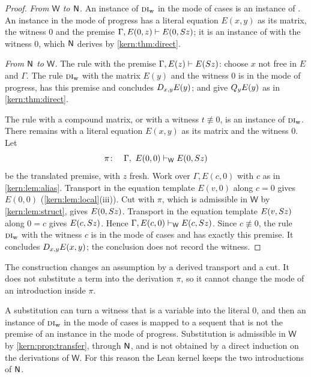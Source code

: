 \begin{proof}
\emph{From $\mathsf{W}$ to $\mathsf{N}$.}  An instance of
$\rulename{DI}_{\mathrm{w}}$ in the mode of cases is an instance of
.  An instance in the mode of progress has a literal equation
$E(x,y)$ as its matrix, the witness $0$ and the premise
$\Gamma,E(0,z)\vdash E(0,S z)$; it is an instance of  with
the witness $0$, which $\mathsf{N}$ derives by \cref{kern:thm:direct}.

\emph{From $\mathsf{N}$ to $\mathsf{W}$.}  The rule  with the premise
$\Gamma,E(z)\vdash E(S z)$: choose $x$ not free in $E$ and $\Gamma$.  The
rule $\rulename{DI}_{\mathrm{w}}$ with the matrix $E(y)$ and the witness $0$
is in the mode of progress, has this premise and concludes
$D_{x,y}E(y)$;  and  give $Q_{y}E(y)$ as in
\cref{kern:thm:direct}.

The rule  with a compound matrix, or with a witness
$t\not\equiv 0$, is an instance of $\rulename{DI}_{\mathrm{w}}$.  There
remains  with a literal equation $E(x,y)$ as its matrix and the
witness $0$.  Let
\[
 \pi\colon\quad\Gamma,\ E(0,0)\proves_{\mathsf{W}}E(0,\Suc z)
\]
be the translated premise, with $z$ fresh.  Work over $\Gamma,E(c,0)$ with
$c$ as in \cref{kern:lem:alias}.  Transport in the equation template $E(v,0)$
along $c=0$ gives $E(0,0)$ (\cref{kern:lem:local}(iii)).  Cut with $\pi$,
which is admissible in $\mathsf{W}$ by \cref{kern:lem:struct}, gives
$E(0,S z)$.  Transport in the equation template $E(v,S z)$ along $0=c$
gives $E(c,S z)$.  Hence
$\Gamma,E(c,0)\vdash_{\mathsf{W}}E(c,S z)$.  Since $c\not\equiv 0$, the
rule $\rulename{DI}_{\mathrm{w}}$ with the witness $c$ is in the mode of
cases and has exactly this premise.  It concludes $D_{x,y}E(x,y)$; the
conclusion does not record the witness.
\end{proof}

The construction changes an assumption by a derived transport and a cut.  It
does not substitute a term into the derivation $\pi$, so it cannot change the
mode of an introduction inside $\pi$.

\begin{remark}
\label{kern:rem:wsubst}
A substitution can turn a witness that is a variable into the literal $0$,
and then an instance of $\rulename{DI}_{\mathrm{w}}$ in the mode of cases is
mapped to a sequent that is not the premise of an instance in the mode of
progress.  Substitution is admissible in $\mathsf{W}$ by
\cref{kern:prop:transfer}, through $\mathsf{N}$, and is not obtained by a direct
induction on the derivations of $\mathsf{W}$.  For this reason the Lean
kernel keeps the two introductions of $\mathsf{N}$.
\end{remark}

